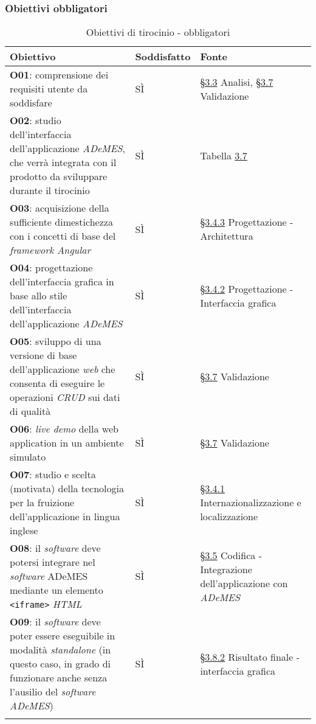 \subsubsection*{Obiettivi obbligatori}
\begin{longtable}{>{\centering\arraybackslash}m{}>{\centering\arraybackslash}m{}>{\centering\arraybackslash}m{}}
    \hline
    \rowcolor{black}
    \color{white}\textbf{Obiettivo} & \color{white}\textbf{Soddisfatto} & \color{white}\textbf{Fonte} \\
    \hline
    \endhead %
    \textbf{O01}: comprensione dei requisiti utente da soddisfare & SÌ & \hyperref[sec:analisi]{§3.3} Analisi, \hyperref[sec:validazione]{§3.7} Validazione \\
    \hline
    \textbf{O02}: studio dell’interfaccia dell’applicazione \textit{ADeMES}, che verrà integrata con il prodotto da sviluppare durante il tirocinio & SÌ & Tabella \hyperref[tab:colors]{3.7} \\
    \hline
    \textbf{O03}: acquisizione della sufficiente dimestichezza con i concetti di base del \textit{framework Angular} & SÌ & \hyperref[subsec:architettura]{§3.4.3} Progettazione - Architettura \\
    \hline
    \textbf{O04}: progettazione dell'interfaccia grafica in base allo stile dell'interfaccia dell'applicazione \textit{ADeMES} & SÌ & \hyperref[subsec:interfaccia]{§3.4.2} Progettazione - Interfaccia grafica  \\
    \hline
    \textbf{O05}: sviluppo di una versione di base dell'applicazione \textit{web} che consenta di eseguire le operazioni \textit{CRUD} sui dati di qualità & SÌ & \hyperref[sec:validazione]{§3.7} Validazione \\
    \hline
    \textbf{O06}: \textit{live demo} della web application in un ambiente simulato & SÌ & \hyperref[sec:validazione]{§3.7} Validazione \\
    \hline
    \textbf{O07}: studio e scelta (motivata) della tecnologia per la fruizione dell'applicazione in lingua inglese & SÌ & \hyperref[subsec:internazionalizzazione]{§3.4.1} Internazionalizzazione e localizzazione \\
    \hline
    \textbf{O08}: il \textit{software} deve potersi integrare nel \textit{software} ADeMES mediante un elemento \texttt{<iframe>} \textit{HTML} & SÌ & \hyperref[subsec:integrazione]{§3.5} Codifica - Integrazione dell'applicazione con \textit{ADeMES}\\
    \hline
    \textbf{O09}: il \textit{software} deve poter essere eseguibile in modalità \textit{standalone} (in questo caso, in grado di funzionare anche senza l'ausilio del \textit{software ADeMES}) & SÌ & \hyperref[subsec:interfaccia-risultato]{§3.8.2} Risultato finale - interfaccia grafica \\
    \hline
    \caption{Obiettivi di tirocinio - obbligatori}
\end{longtable}

